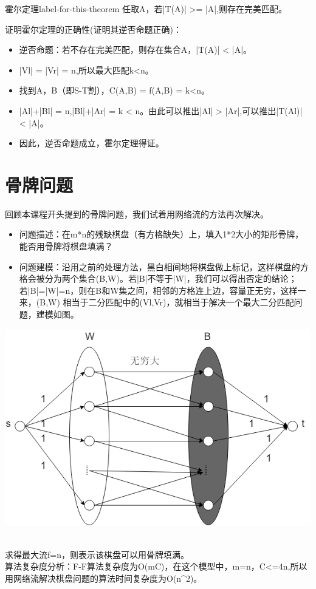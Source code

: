 \begin{theorem}{霍尔定理}{label-for-this-theorem}
  任取A\subseteqVl，若|T(A)| >= |A|,则存在完美匹配。
\end{theorem}
证明霍尔定理的正确性(证明其逆否命题正确)：
\begin{itemize}
  \item 逆否命题：若不存在完美匹配，则存在集合A，|T(A)| < |A|。
  \item |Vl| = |Vr| = n,所以最大匹配k<n。
  \item 找到A，B（即S-T割），C(A,B) = f(A,B) = k<n。
  \item |Al|+|Bl| = n,|Bl|+|Ar| = k < n。由此可以推出|Al| > |Ar|,可以推出|T(Al)| < |A|。
  \item 因此，逆否命题成立，霍尔定理得证。
\end{itemize}

\section{骨牌问题}
回顾本课程开头提到的骨牌问题，我们试着用网络流的方法再次解决。\\
\begin{itemize}
  \item 问题描述：在m*n的残缺棋盘（有方格缺失）上，填入1*2大小的矩形骨牌，能否用骨牌将棋盘填满？\\
  \item 问题建模：沿用之前的处理方法，黑白相间地将棋盘做上标记，这样棋盘的方格会被分为两个集合(B,W)。若|B|不等于|W|，我们可以得出否定的结论；若|B|=|W|=n，则在B和W集之间，相邻的方格连上边，容量正无穷，这样一来，(B,W) 相当于二分匹配中的(Vl,Vr)，就相当于解决一个最大二分匹配问题，建模如图。\\
\end{itemize}
\centerline{\includegraphics[scale=0.6]{image/networkflow4.png}}
\\求得最大流f=n，则表示该棋盘可以用骨牌填满。\\
算法复杂度分析：F-F算法复杂度为O(mC)，在这个模型中，m=n，C<=4n,所以用网络流解决棋盘问题的算法时间复杂度为O(n^2)。

